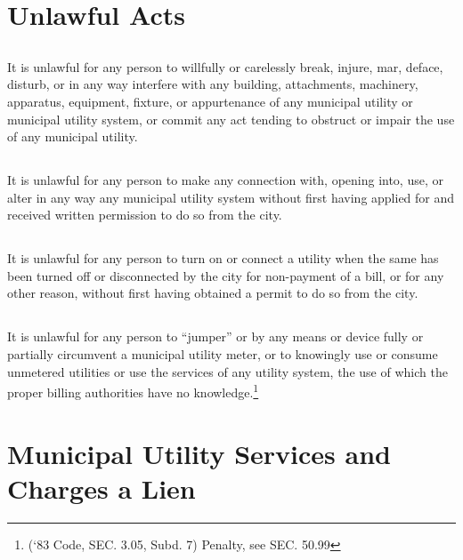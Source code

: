 \section{Unlawful Acts}
\subsection{}
It is unlawful for any person to willfully or carelessly break, injure, mar, deface, disturb, or in any way interfere with any building, attachments, machinery, apparatus, equipment, fixture, or appurtenance of any municipal utility or municipal utility system, or commit any act tending to obstruct or impair the use of any municipal utility.
\subsection{}
It is unlawful for any person to make any connection with, opening into, use, or alter in any way any municipal utility system without first having applied for and received written permission to do so from the city.
\subsection{}
It is unlawful for any person to turn on or connect a utility when the same has been turned off or disconnected by the city for non-payment of a bill, or for any other reason, without first having obtained a permit to do so from the city.
\subsection{}
It is unlawful for any person to “jumper” or by any means or device fully or partially circumvent a municipal utility meter, or to knowingly use or consume unmetered utilities or use the services of any utility system, the use of which the proper billing authorities have no knowledge.\footnote{(‘83 Code, SEC. 3.05, Subd. 7)  Penalty, see SEC. 50.99}

\section{Municipal Utility Services and Charges a Lien}
